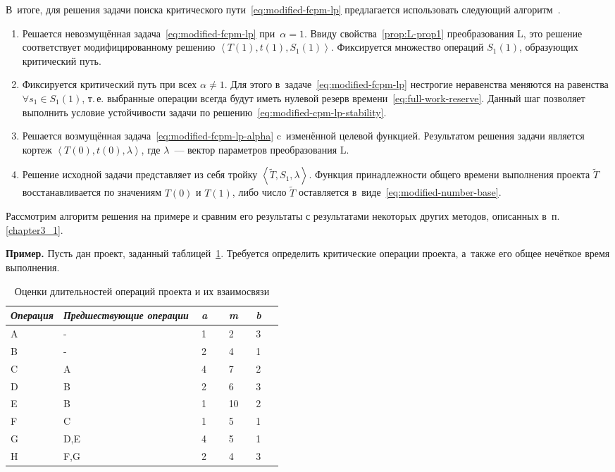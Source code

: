 В~итоге, для решения задачи поиска критического пути~\eqref{eq:modified-fcpm-lp} предлагается использовать следующий алгоритм~\cite{Vorontsov_VSTU}.
\begin{enumerate}
  \item Решается невозмущённая задача~\eqref{eq:modified-fcpm-lp} при~$\alpha=1$. Ввиду свойства~\ref{prop:L-prop1} преобразования L, это решение соответствует модифицированному решению $\left \langle T\left(1\right), t\left(1\right), S_1\left(1\right) \right \rangle$. Фиксируется множество операций $S_1\left(1\right)$, образующих критический путь.
  \item Фиксируется критический путь при всех $\alpha \neq 1$. Для этого в~задаче~\eqref{eq:modified-fcpm-lp} нестрогие неравенства меняются на равенства $\forall s_1 \in S_1\left(1\right)$, т.\,е. выбранные операции всегда будут иметь нулевой резерв времени~\eqref{eq:full-work-reserve}. Данный шаг позволяет выполнить условие устойчивости задачи по решению~\eqref{eq:modified-cpm-lp-stability}.
  \item Решается возмущённая задача~\eqref{eq:modified-fcpm-lp-alpha} c~изменённой целевой функцией. Результатом решения задачи является кортеж $\left \langle T\left(0\right), t\left(0\right), \lambda \right \rangle$, где $\lambda$~--- вектор параметров преобразования L.
  \item Решение исходной задачи представляет из себя тройку $\left \langle \tilde T, S_1, \lambda \right \rangle$. Функция принадлежности общего времени выполнения проекта $\tilde T$ восстанавливается по значениям $T\left(0\right)$ и $T\left(1\right)$, либо число $\tilde T$ оставляется в~виде~\eqref{eq:modified-number-base}.
\end{enumerate}
  
Рассмотрим алгоритм решения на примере и сравним его результаты с результатами некоторых других методов, описанных в~п.\,\ref{chapter3_1}.

\textbf{Пример.} Пусть дан проект, заданный таблицей~\ref{t:sample-project-estimates}. Требуется определить критические операции проекта, а~также его общее нечёткое время выполнения.

\begin{table}[b!]
\caption{Оценки длительностей операций проекта и их взаимосвязи}
\label{t:sample-project-estimates}
\begin{center}
\begin{tabularx}{0.8\textwidth}{|p{0.15\linewidth}|X|p{0.1\linewidth}|p{0.1\linewidth}|p{0.1\linewidth}|}
	\hline
		\centering \textit{Операция} & \centering \textit{Предшествующие операции} & \centering \textit{a} & \centering \textit{m} & \centering \textit{b} \tabularnewline	\hline
	\hline
		A & -   & 1 & 2  & 3 \tabularnewline \hline
		B & -   & 2 & 4  & 1 \tabularnewline \hline
		C & A   & 4 & 7  & 2 \tabularnewline \hline
		D & B   & 2 & 6  & 3 \tabularnewline \hline
		E & B   & 1 & 10 & 2 \tabularnewline \hline
		F & C   & 1 & 5  & 1 \tabularnewline \hline
		G & D,E & 4 & 5  & 1 \tabularnewline \hline
		H & F,G & 2 & 4  & 3 \tabularnewline
    \hline
\end{tabularx}
\end{center}
\end{table}

